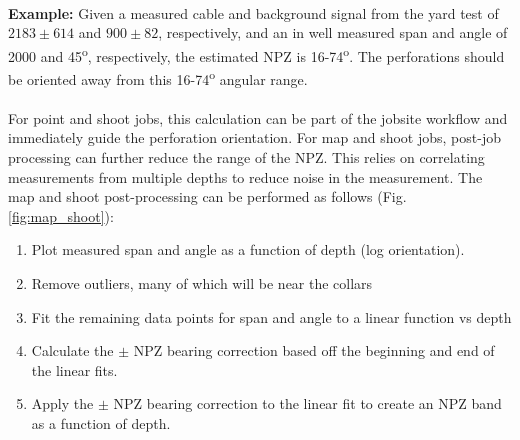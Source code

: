 \documentclass[paper=a4, fontsize=11pt]{scrartcl}
\numberwithin{equation}{section}		%
\numberwithin{figure}{section}			%
\numberwithin{table}{section}				%
\begin{document}
\paragraph{}
\textbf{Example:} Given a measured cable and background signal from the yard test of ${2183\pm614}$ and ${900\pm82}$, respectively, and an in well measured span and angle of 2000 and 45\textsuperscript{o}, respectively, the estimated NPZ is 16-74\textsuperscript{o}.  The perforations should be oriented away from this 16-74\textsuperscript{o} angular range.

\paragraph{}
For point and shoot jobs, this calculation can be part of the jobsite workflow and immediately guide the perforation orientation.  For map and shoot jobs, post-job processing can further reduce the range of the NPZ.  This relies on correlating measurements from multiple depths to reduce noise in the measurement.  The map and shoot post-processing can be performed as follows (Fig.\ref{fig:map_shoot}):
\begin{enumerate}
    \item Plot measured span and angle as a function of depth (log orientation).
    \item Remove outliers, many of which will be near the collars
    \item Fit the remaining data points for span and angle to a linear function vs depth
    \item Calculate the $\pm$ NPZ bearing correction based off the beginning and end of the linear fits.
    \item Apply the $\pm$ NPZ bearing correction to the linear fit to create an NPZ band as a function of depth.
\end{enumerate}
\end{document}
